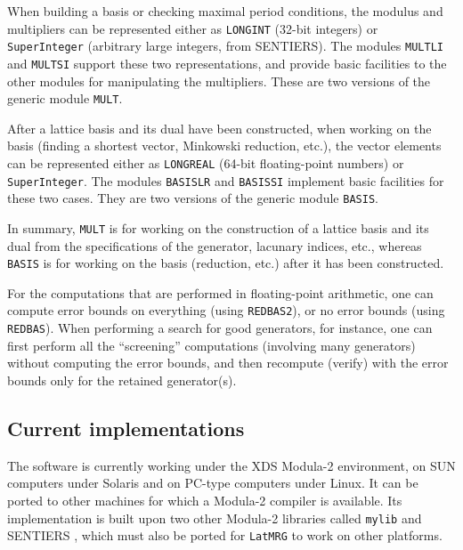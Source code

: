 When building a basis or checking maximal period conditions,
the modulus and multipliers can be represented either as {\tt LONGINT}
(32-bit integers) or {\tt SuperInteger} (arbitrary large integers, from
SENTIERS). The modules {\tt MULTLI} and {\tt MULTSI} support these
two representations, and provide basic facilities to the other modules
for manipulating the multipliers.
These are two versions of the generic module {\tt MULT}.

After a lattice basis and its dual have been constructed, when working 
on the basis (finding a shortest vector, Minkowski reduction, etc.),
the vector elements can be represented either as {\tt LONGREAL}
(64-bit floating-point numbers) or {\tt SuperInteger}.
The modules {\tt BASISLR} and {\tt BASISSI} implement basic facilities 
for these two cases. They are two versions of the generic module {\tt BASIS}.

In summary, {\tt MULT} is for working on the construction of a lattice basis
and its dual from the specifications of the generator, lacunary indices, 
etc., whereas {\tt BASIS} is for working on the basis (reduction, etc.)
after it has been constructed.

For the computations that are performed in floating-point arithmetic,
one can compute error bounds on everything (using {\tt REDBAS2}),
or no error bounds (using {\tt REDBAS}).
When performing a search for good generators, for instance, one can
first perform all the ``screening'' computations (involving many generators)
without computing the error bounds, and then recompute (verify)
with the error bounds only for the retained generator(s).

\subsection {Current implementations}

The software is currently working under the XDS Modula-2 environment,
on SUN computers under Solaris and on PC-type computers under Linux.
It can be ported to other machines for which a Modula-2 compiler is available.
Its implementation is built upon two other Modula-2 libraries called
{\tt mylib} \cite{iLEC01m} and SENTIERS \cite{iLEC88d}, 
which must also be ported for {\tt LatMRG} to work on other platforms.





